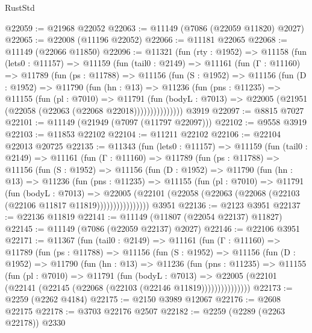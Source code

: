 \begin{lexlean}{RustStd}
\begin{coremodule}
@22059 := @21968 @22052
@22063 := @11149 (@7086 (@22059 @11820) @2027)
@22065 := @22008 (@11196 @22052)
@22066 := @11181 @22065
@22068 := @11149 (@22066 @11850)
@22096 := @11321
    (fun (rty : @1952) =>
    @11158
      (fun (lets0 : @11157) =>
      @11159
        (fun (tail0 : @2149) =>
        @11161
          (fun (Γ : @11160) =>
          @11789
            (fun (ps : @11788) =>
            @11156
              (fun (S : @1952) =>
              @11156
                (fun (D : @1952) =>
                @11790
                  (fun (hn : @13) =>
                  @11236
                    (fun (pns : @11235) =>
                    @11155
                      (fun (pl : @7010) =>
                      @11791
                        (fun (bodyL : @7013) =>
                        @22005 (@21951 (@22058 (@22063 (@22068 @22018)))))))))))))))
    @3919
@22097 := @8815 @7027
@22101 := @11149 (@21949 (@7097 (@11797 @22097)))
@22102 := @9558 @3919
@22103 := @11853 @22102
@22104 := @11211 @22102
@22106 := @22104 @22013 @20725
@22135 := @11343
    (fun (lets0 : @11157) =>
    @11159
      (fun (tail0 : @2149) =>
      @11161
        (fun (Γ : @11160) =>
        @11789
          (fun (ps : @11788) =>
          @11156
            (fun (S : @1952) =>
            @11156
              (fun (D : @1952) =>
              @11790
                (fun (hn : @13) =>
                @11236
                  (fun (pns : @11235) =>
                  @11155
                    (fun (pl : @7010) =>
                    @11791
                      (fun (bodyL : @7013) =>
                      @22005
                        (@22101
                          (@22058 (@22063 (@22068 (@22103 (@22106 @11817 @11819))))))))))))))))
    @3951
@22136 := @2123 @3951
@22137 := @22136 @11819
@22141 := @11149 (@11807 (@22054 @22137) @11827)
@22145 := @11149 (@7086 (@22059 @22137) @2027)
@22146 := @22106 @3951
@22171 := @11367
    (fun (tail0 : @2149) =>
    @11161
      (fun (Γ : @11160) =>
      @11789
        (fun (ps : @11788) =>
        @11156
          (fun (S : @1952) =>
          @11156
            (fun (D : @1952) =>
            @11790
              (fun (hn : @13) =>
              @11236
                (fun (pns : @11235) =>
                @11155
                  (fun (pl : @7010) =>
                  @11791
                    (fun (bodyL : @7013) =>
                    @22005 (@22101 (@22141 (@22145 (@22068 (@22103 (@22146 @11819)))))))))))))))
@22173 := @2259 (@2262 @4184)
@22175 := @2150 @3989 @12067
@22176 := @2608 @22175
@22178 := @3703 @22176 @2507
@22182 := @2259 (@2289 (@2263 @22178)) @2330

\end{coremodule}
\end{lexlean}
